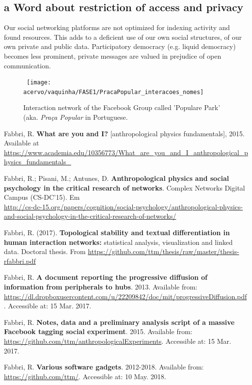 \documentclass[a4paper]{article}
\begin{document}
\subsection{a Word about restriction of access and privacy}
Our social networking platforms are not optimized for indexing activity
and found resources.
This adds to a deficient use of our own social structures,
of our own private and public data.
Participatory democracy (e.g. liquid democracy) becomes less prominent,
private messages are valued in prejudice of open communication.

\begin{figure}[!h]
  \centering
    \hbox{\hspace{1.5em} \texttt{[image: acervo/vaquinha/FASE1/PracaPopular\_interacoes\_nomes]}}
  \caption{Interaction network of the Facebook Group called 'Populare Park' (aka. \emph{Praça Popular} in Portuguese.}
\end{figure}

\begin{thebibliography}{9}
	Fabbri, R. \textbf{What are you and I?} [anthropological physics fundamentals], 2015. Available at \url{https://www.academia.edu/10356773/What\_are\_you\_and\_I\_anthropological\_physics\_fundamentals\_}

	Fabbri, R.; Pisani, M.; Antunes, D. \textbf{Anthropological physics and social psychology in the critical research of networks}. Complex Networks Digital Campus (CS-DC'15).
	Em \\\url{http://cs-dc-15.org/papers/cognition/social-psychology/anthropological-physics-and-social-psychology-in-the-critical-research-of-networks/}

Fabbri, R. (2017). \textbf{Topological stability and textual differentiation in human interaction networks:}
		statistical analysis, visualization and linked data. Doctoral thesis.
		From \url{https://github.com/ttm/thesis/raw/master/thesis-rfabbri.pdf}

	Fabbri, R. \textbf{A document reporting the progressive diffusion of information from peripherals to hubs}. 2013. Available from: \url{https://dl.dropboxusercontent.com/u/22209842/doc/mit/progressiveDiffusion.pdf}. Accessible at: 15 Mar. 2017.

	Fabbri, R. \textbf{Notes, data and a preliminary analysis script of a massive Facebook tagging social experiment}. 2015. Available from: \url{https://github.com/ttm/anthropologicalExperiments}. Accessible at: 15 Mar. 2017.

	Fabbri, R. \textbf{Various software gadgets}. 2012-2018. Available from: \url{https://github.com/ttm/}. Accessible at: 10 May. 2018.

\end{thebibliography}
\end{document}
